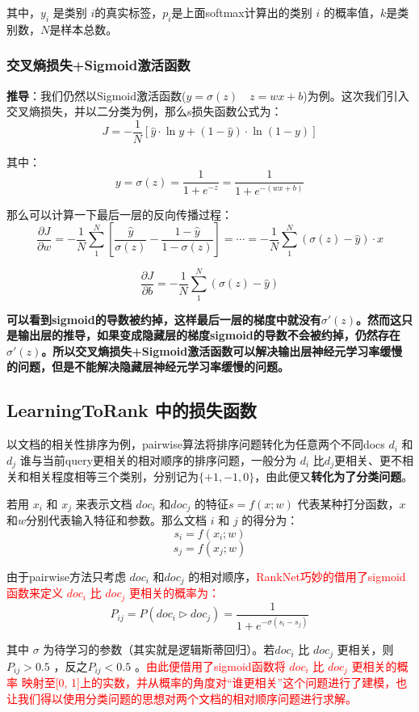 \documentclass[12pt]{article}
\begin{document}
其中，$y_i$ 是类别 $i$的真实标签，$p_i$是上面softmax计算出的类别 $i$ 的概率值，$k$是类别数，$N$是样本总数。

\subsubsection{交叉熵损失+Sigmoid激活函数}
\textbf{推导}：我们仍然以Sigmoid激活函数($y = \sigma(z) \quad z = wx + b$)为例。这次我们引入交叉熵损失，并以二分类为例，那么s损失函数公式为：
$$
J = -\frac{1}{N}[\hat{y}\cdot\ln{y} + (1-\hat{y})\cdot\ln{(1-y)}]
$$

其中：
$$
y = \sigma(z) = \frac{1}{1+e^{-z}} = \frac{1}{1+e^{-(wx+b)}}
$$

那么可以计算一下最后一层的反向传播过程：
$$
\frac{\partial J}{\partial w} = -\frac{1}{N}\sum_1^N[\frac{\hat{y}}{\sigma(z)} - \frac{1-\hat{y}}{1-\sigma(z)}] = \cdots =  -\frac{1}{N}\sum_1^N(\sigma(z)-\hat{y})\cdot x
$$

$$
\frac{\partial J}{\partial b} = -\frac{1}{N}\sum_1^N(\sigma(z)-\hat{y})
$$

\textbf{可以看到sigmoid的导数被约掉，这样最后一层的梯度中就没有$\sigma'(z)$。然而这只是输出层的推导，如果变成隐藏层的梯度sigmoid的导数不会被约掉，仍然存在$\sigma'(z)$。所以交叉熵损失+Sigmoid激活函数可以解决输出层神经元学习率缓慢的问题，但是不能解决隐藏层神经元学习率缓慢的问题。}

\subsection{LearningToRank 中的损失函数\cite{About_RankNet_LambdaRank}}
以文档的相关性排序为例，pairwise算法将排序问题转化为任意两个不同docs $d_i$ 和 $d_j$ 谁与当前query更相关的相对顺序的排序问题，一般分为 $d_i$ 比$d_j$更相关、更不相关和相关程度相等三个类别，分别记为$\{+1, -1, 0\}$，由此便又\textbf{转化为了分类问题}。

若用 $x_i$ 和 $x_j$ 来表示文档 $doc_i$ 和$doc_j$ 的特征$s = f(x;w)$ 代表某种打分函数，$x$和$w$分别代表输入特征和参数。那么文档 $i$ 和 $j$ 的得分为：
$$
s_i = f(x_i;w)
$$
$$
s_j = f(x_j;w)
$$

由于pairwise方法只考虑 $doc_i$ 和$doc_j$ 的相对顺序，\textcolor{red}{RankNet巧妙的借用了sigmoid函数来定义 $doc_i$ 比 $doc_j$ 更相关的概率为：}
$$
P_{ij} = P(doc_i \rhd doc_j) = \frac{1}{1 + e^{-\sigma(s_i - s_j)}}
$$

其中 $\sigma$ 为待学习的参数（其实就是逻辑斯蒂回归）。若$doc_i$ 比 $doc_j$ 更相关，则 $P_{ij} > 0.5$ ，反之$P_{ij} < 0.5$ 。\textcolor{red}{由此便借用了sigmoid函数将 $doc_i$ 比 $doc_j$ 更相关的概率 映射至[0, 1]上的实数，并从概率的角度对“谁更相关”这个问题进行了建模，也让我们得以使用分类问题的思想对两个文档的相对顺序问题进行求解。}
\end{document}
